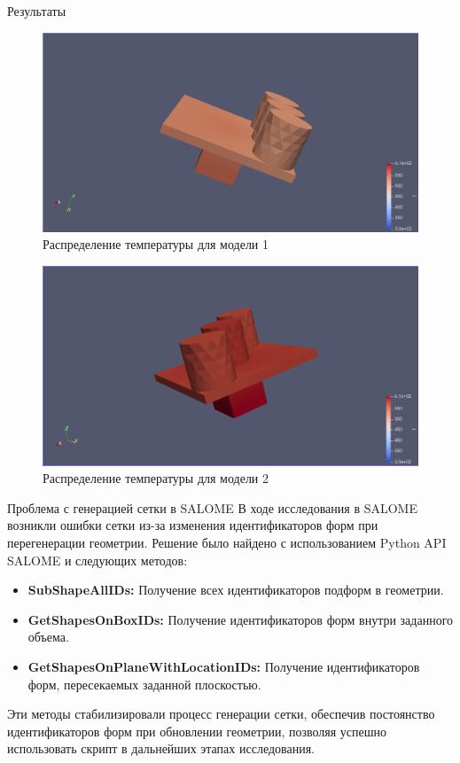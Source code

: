 \documentclass{beamer}
\begin{document}
\begin{frame}{Результаты}
	\begin{figure}[h]
		\begin{center}
			\includegraphics[width=0.45\linewidth]{5.1.png}
			\caption{Распределение температуры для модели 1}
		\end{center}
	\end{figure}
	\begin{figure}[h]
		\begin{center}
			\includegraphics[width=0.45\linewidth]{5.2.png}
			\caption{Распределение температуры для модели 2}
		\end{center}
	\end{figure}
\end{frame}

\begin{frame}{Проблема с генерацией сетки в SALOME}
	В ходе исследования в SALOME возникли ошибки сетки из-за изменения идентификаторов форм при перегенерации геометрии. Решение было найдено с использованием Python API SALOME и следующих методов:

	\begin{itemize}[label=•]
		\item \textbf{SubShapeAllIDs:}
		      Получение всех идентификаторов подформ в геометрии.

		\item \textbf{GetShapesOnBoxIDs:}
		      Получение идентификаторов форм внутри заданного объема.

		\item \textbf{GetShapesOnPlaneWithLocationIDs:}
		      Получение идентификаторов форм, пересекаемых заданной плоскостью.
	\end{itemize}

	Эти методы стабилизировали процесс генерации сетки, обеспечив постоянство идентификаторов форм при обновлении геометрии, позволяя успешно использовать скрипт в дальнейших этапах исследования.
\end{frame}
\end{document}
